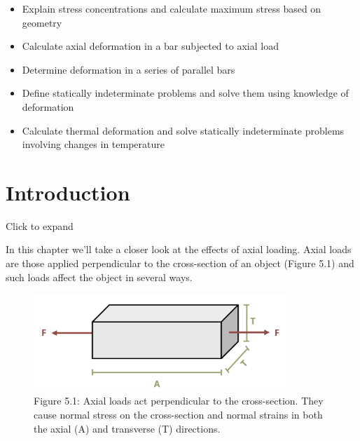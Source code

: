 \documentclass[
  letterpaper,
  DIV=11,
  numbers=noendperiod]{scrreprt}
\providecommand{\tightlist}{%
  \setlength{\itemsep}{0pt}\setlength{\parskip}{0pt}}\usepackage{longtable,booktabs,array}
\theoremstyle{definition}
\theoremstyle{remark}
\begin{document}
\begin{tcolorbox}[enhanced jigsaw, leftrule=.75mm, colbacktitle=quarto-callout-note-color!10!white, breakable, opacityback=0, colback=white, titlerule=0mm, toprule=.15mm, colframe=quarto-callout-note-color-frame, coltitle=black, title={Learning Objectives}, toptitle=1mm, bottomrule=.15mm, rightrule=.15mm, left=2mm, arc=.35mm, opacitybacktitle=0.6, bottomtitle=1mm]

\begin{itemize}
\tightlist
\item
  Explain stress concentrations and calculate maximum stress based on
  geometry
\item
  Calculate axial deformation in a bar subjected to axial load
\item
  Determine deformation in a series of parallel bars
\item
  Define statically indeterminate problems and solve them using
  knowledge of deformation
\item
  Calculate thermal deformation and solve statically indeterminate
  problems involving changes in temperature
\end{itemize}

\end{tcolorbox}

\section*{Introduction}\label{introduction-4}


Click to expand

In this chapter we'll take a closer look at the effects of axial
loading. Axial loads are those applied perpendicular to the
cross-section of an object (Figure 5.1) and such loads affect the object
in several ways.

\begin{figure}[H]

{\centering \includegraphics[width=3.76042in,height=\textheight]{images/PNGs/Figure 5.1.png}

}

\caption{Figure 5.1: Axial loads act perpendicular to the cross-section.
They cause normal stress on the cross-section and normal strains in both
the axial (A) and transverse (T) directions.}

\end{figure}%
\end{document}
